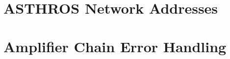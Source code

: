 \chapter{ASTHROS Network Addresses}
\label{chap2/app:hosts}

\chapter{Amplifier Chain Error Handling}
\label{chap2/app:if_amp_errors}